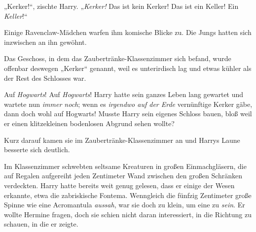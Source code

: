 „Kerker!“, zischte Harry. „\emph{Kerker!} Das ist kein Kerker! Das ist ein Keller! Ein \emph{Keller}!“ 

Einige Ravenclaw-Mädchen warfen ihm komische Blicke zu. Die Jungs hatten sich inzwischen an ihn gewöhnt. 

Das Geschoss, in dem das Zaubertränke-Klassenzimmer sich befand, wurde offenbar deswegen „Kerker“ genannt, weil es unterirdisch lag und etwas kühler als der Rest des Schlosses war. 

Auf \emph{Hogwarts}! Auf \emph{Hogwarts}! Harry hatte sein ganzes Leben lang gewartet und wartete nun \emph{immer noch}; wenn es \emph{irgendwo auf der Erde} vernünftige Kerker gäbe, dann doch wohl auf Hogwarts! Musste Harry sein eigenes Schloss bauen, bloß weil er einen klitzekleinen bodenlosen Abgrund sehen wollte? 

Kurz darauf kamen sie im Zaubertränke-Klassenzimmer an und Harrys Laune besserte sich deutlich. 

Im Klassenzimmer schwebten seltsame Kreaturen in großen Einmachgläsern, die auf Regalen aufgereiht jeden Zentimeter Wand zwischen den großen Schränken verdeckten. Harry hatte bereits weit genug gelesen, dass er einige der Wesen erkannte, etwa die zabriskische Fontema. Wenngleich die fünfzig Zentimeter große Spinne wie eine Acromantula \emph{aussah}, war sie doch zu klein, um eine zu \emph{sein}. Er wollte Hermine fragen, doch sie schien nicht daran interessiert, in die Richtung zu schauen, in die er zeigte. 

